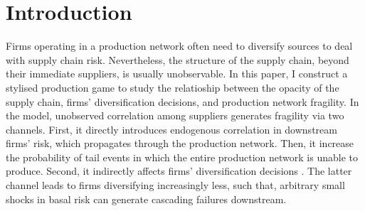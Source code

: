 \documentclass[../../main.tex]{subfiles}
\begin{document}
\section{Introduction}

\iffalse
\notes{
  \begin{enumerate}
    \item Research question
    \item Contribution to the literature
    \item Why do we care?
  \end{enumerate}
}
\fi

Firms operating in a production network often need to diversify sources to deal with supply chain risk. Nevertheless, the structure of the supply chain, beyond their immediate suppliers, is usually unobservable. In this paper, I construct a stylised production game to study the relatioship between the opacity of the supply chain, firms' diversification decisions, and production network fragility. In the model, unobserved correlation among suppliers generates fragility via two channels. First, it directly introduces endogenous correlation in downstream firms' risk, which propagates through the production network. Then, it increase the probability of tail events in which the entire production network is unable to produce. Second, it indirectly affects firms' diversification decisions . The latter channel leads to firms diversifying increasingly less, such that, arbitrary small shocks in basal risk can generate cascading failures downstream.
\end{document}
